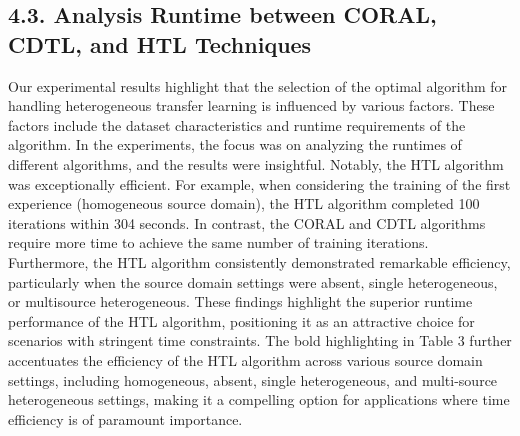 \subsection{4.3.	Analysis Runtime between CORAL, CDTL, and HTL Techniques}
Our experimental results highlight that the selection of the optimal algorithm for handling heterogeneous transfer learning is influenced by various factors. These factors include the dataset characteristics and runtime requirements of the algorithm. In the experiments, the focus was on analyzing the runtimes of different algorithms, and the results were insightful. Notably, the HTL algorithm was exceptionally efficient. For example, when considering the training of the first experience (homogeneous source domain), the HTL algorithm completed 100 iterations within 304 seconds. In contrast, the CORAL and CDTL algorithms require more time to achieve the same number of training iterations. Furthermore, the HTL algorithm consistently demonstrated remarkable efficiency, particularly when the source domain settings were absent, single heterogeneous, or multisource heterogeneous. These findings highlight the superior runtime performance of the HTL algorithm, positioning it as an attractive choice for scenarios with stringent time constraints. The bold highlighting in Table 3 further accentuates the efficiency of the HTL algorithm across various source domain settings, including homogeneous, absent, single heterogeneous, and multi-source heterogeneous settings, making it a compelling option for applications where time efficiency is of paramount importance.

\begin{table}[h]
  \centering
  \caption{Runtimes (in seconds) for CORAL, CDTL, and HTL.}
  \label{table:6_table3}
  \end{table}
  
